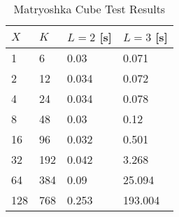 \begin{table}[H]
    \centering
    \begin{tabular}{llll}
      \toprule
      $X$ & $K$ & $L=2$ [s] & $L=3$ [s] \\ \midrule
      1	& 6 & 0.03	& 0.071	         \\
      2	    & 12	& 0.034	& 0.072 	 \\
      4	    & 24	& 0.034	& 0.078	   \\
      8	    & 48	& 0.03	& 0.12	   \\
      16    & 96	& 0.032	& 0.501	   \\
      32    & 192	& 0.042	& 3.268	   \\
      64    & 384	& 0.09	& 25.094	 \\
      128   & 768	& 0.253	& 193.004  \\
      \bottomrule
    \end{tabular}

    \caption[Matryoshka Cube Test Results]{Matryoshka Cube Test Results}
    \label{tab:matryoshka}
\end{table}
